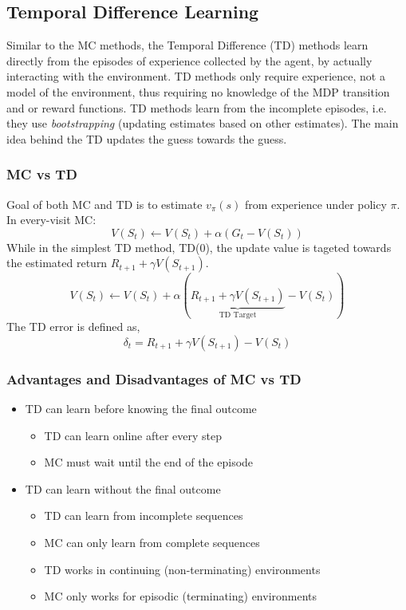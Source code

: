 \subsection{Temporal Difference Learning}
Similar to the MC methods, the Temporal Difference (TD) methods learn directly from the
episodes of experience collected by the agent, by actually interacting with the environment.
TD methods only require experience, not a model of the environment, thus requiring no knowledge
of the MDP transition and or reward functions. TD methods learn from the incomplete episodes,
i.e. they use \emph{bootstrapping} (updating estimates based on other estimates). The main
idea behind the TD updates the guess towards the guess.

\subsubsection*{MC vs TD}
Goal of both MC and TD is to estimate \(v_{\pi}(s)\) from experience under policy \(\pi\).
In every-visit MC:
\[
    V(S_t) \leftarrow V(S_t) + \alpha\left( 
        G_t - V(S_t)
     \right)      
\]
While in the simplest TD method, TD(0), the update value is tageted towards the estimated
return \(R_{t+1} + \gamma V(S_{t+1})\).
\[
    V(S_t) \leftarrow V(S_t) + \alpha\left( 
        \underset{\text{TD Target} }{\underbrace{R_{t+1} + \gamma V(S_{t+1})}}
        - V(S_t)
     \right)
\]
The TD error is defined as,
\[
    \delta_t = R_{t+1} + \gamma V(S_{t+1}) - V(S_t)
\]

\subsubsection{Advantages and Disadvantages of MC vs TD}
\begin{itemize}
    \item  TD can learn before knowing the final outcome
    \begin{itemize}
        \item TD can learn online after every step
        \item MC must wait until the end of the episode
    \end{itemize}
    \item TD can learn without the final outcome
    \begin{itemize}
        \item TD can learn from incomplete sequences
        \item MC can only learn from complete sequences
        \item TD works in continuing (non-terminating) environments
        \item MC only works for episodic (terminating) environments
    \end{itemize}
\end{itemize}

